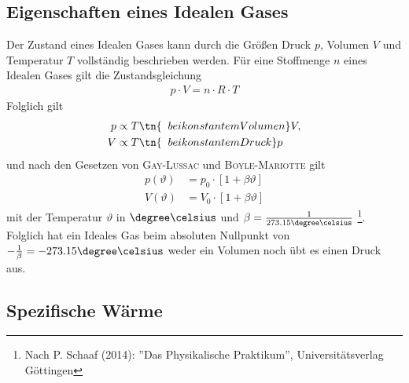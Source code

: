 \documentclass[12pt, a4paper, twoside]{scrartcl}
\newcommand{\person}[1]{\textsc{#1}}
\begin{document}
\subsection{Eigenschaften eines Idealen Gases}
\label{subsec:theorie_eigenschaften_ideales_gas}
Der Zustand eines Idealen Gases kann durch die Größen Druck $p$, Volumen $V$ und Temperatur $T$ vollständig beschrieben werden.
Für eine Stoffmenge $n$ eines Idealen Gases gilt die Zustandsgleichung
\begin{align}
 p\cdot V = n\cdot R\cdot T \label{eq:zustandsgleichung}
\end{align}
Folglich gilt
\begin{align*}
 p &\propto T \tn{\;\; bei konstantem Volumen } V, \\
 V &\propto T \tn{\;\; bei konstantem Druck } p 
\end{align*}
und nach den Gesetzen von \person{Gay-Lussac} und \person{Boyle-Mariotte} gilt
\begin{align*}
 p\left(\vartheta\right) &= p_0\cdot\left[1+\beta\vartheta\right] \\
 V\left(\vartheta\right) &= V_0\cdot\left[1+\beta\vartheta\right]
\end{align*}
mit der Temperatur $\vartheta$ in $\degree\celsius$ und $\beta = \frac{1}{273.15 \degree\celsius}$ \footnote{Nach P. Schaaf (2014): ”Das Physikalische Praktikum”, Universitätsverlag Göttingen}.
Folglich hat ein Ideales Gas beim absoluten Nullpunkt von $-\frac{1}{\beta} = -273.15 \degree\celsius$ weder ein Volumen noch übt es einen Druck aus.

\subsection{Spezifische Wärme}
\end{document}
